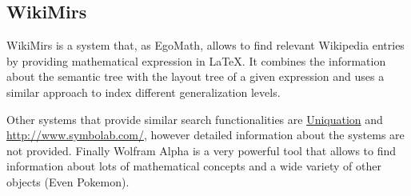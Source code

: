 \subsection{WikiMirs}
WikiMirs\cite{wikimirs} is a system that, as EgoMath, allows to find relevant Wikipedia entries by providing mathematical expression in \LaTeX. It combines the information about the semantic tree with the layout tree of a given expression and uses a similar approach to index different generalization levels.

Other systems that provide similar search functionalities are \url{Uniquation} and \url{http://www.symbolab.com/}, however detailed information about the systems are not provided. Finally Wolfram Alpha\cite{wolframalpha} is a very powerful tool that allows to find information about lots of mathematical concepts and a wide variety of other objects (Even Pokemon).

